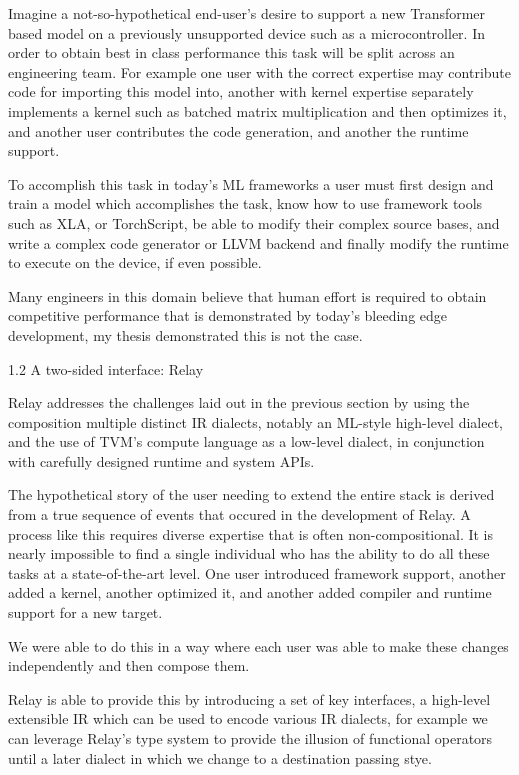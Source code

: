 Imagine a not-so-hypothetical end-user’s desire to support a new Transformer based model on a previously unsupported device such as a microcontroller. In order to obtain best in class performance this task will be split across an engineering team. For example one user with the correct expertise may contribute code for importing this model into,  another with kernel expertise separately implements a kernel such as batched matrix multiplication and then optimizes it, and another user contributes the code generation, and another the runtime support.

To accomplish this task in today’s ML frameworks a user must first design and train a model which accomplishes the task, know how to use framework tools such as XLA, or TorchScript, be able to modify their complex source bases, and write a complex code generator or LLVM backend and finally modify the runtime to execute on the device, if even possible.

Many engineers in this domain believe that human effort is required to obtain competitive performance that is demonstrated by today’s bleeding edge development, my thesis demonstrated this is not the case.

1.2 A two-sided interface: Relay

Relay addresses the challenges laid out in the previous section by using the composition multiple distinct IR dialects, notably an ML-style high-level dialect, and the use of TVM’s compute language as a low-level dialect, in conjunction with carefully designed runtime and system APIs.

The hypothetical story of the user needing to extend the entire stack is derived from a true sequence of events that occured in the development of Relay. A process like this requires diverse expertise that is often non-compositional. It is nearly impossible to find a single individual who has the ability to do all these tasks at a state-of-the-art level.  One user introduced framework support, another added a kernel, another optimized it, and another added compiler and runtime support for a new target.

We were able to do this in a way where each user was able to make these changes independently and then compose them.

Relay is able to provide this by introducing a set of key interfaces, a high-level extensible IR which can be used to encode various IR dialects, for example we can leverage Relay’s type system to provide the illusion of functional operators until a later dialect in which we change to a destination passing stye.

